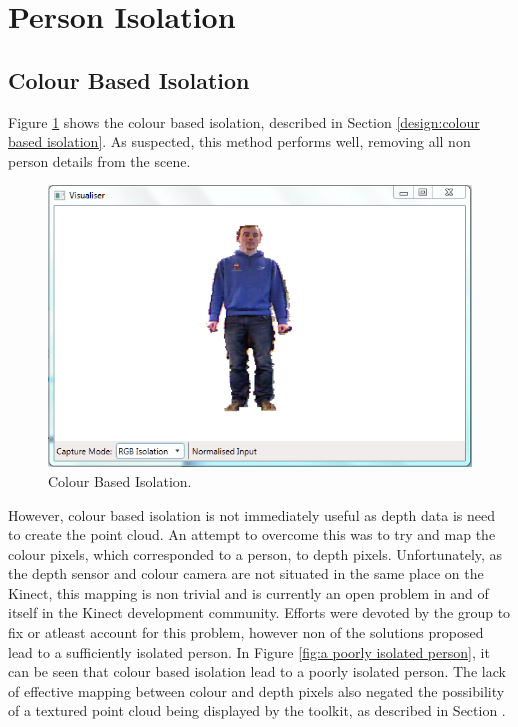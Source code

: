 \section{Person Isolation}
\label{testing:person isolation}

\subsection{Colour Based Isolation}
\label{testing:colour based isolation}
Figure \ref{fig:colour based cut off} shows the colour based isolation, described in Section \ref{design:colour based isolation}.
As suspected, this method performs well, removing all non person  details from the scene.\\

\begin{figure}[h]
\begin{center}
\includegraphics[scale=0.8]{./testing/parse4} 
\end{center}
\caption{Colour Based Isolation.}
\label{fig:colour based cut off}
\end{figure} 

However, colour based isolation is not immediately useful as depth data is need to create the point cloud. An attempt to overcome this was to try and map the colour pixels, which corresponded to a person, to depth pixels.
Unfortunately, as the depth sensor and colour camera are not situated in the same place on the Kinect, this mapping is non trivial and is currently an open problem in and of itself in the Kinect development community.
Efforts were devoted by the group to fix or atleast account for this problem, however non of the solutions proposed lead to a sufficiently isolated person.
In Figure \ref{fig:a poorly isolated person}, it can be seen that colour based isolation lead to a poorly isolated person. 
The lack of effective mapping between colour and depth pixels also negated the possibility of a textured point cloud being displayed by the toolkit, as described in Section .

